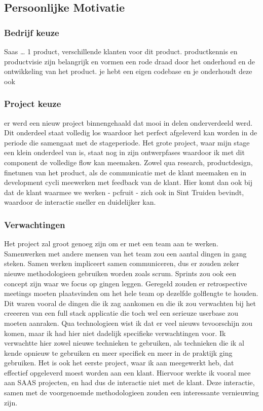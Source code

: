 \subsection {Persoonlijke Motivatie}

\subsubsection {Bedrijf keuze}

Saas … 1 product, verschillende klanten voor dit product.
productkennis en productvisie zijn belangrijk en vormen een rode draad door het onderhoud
en de ontwikkeling van het product.
je hebt een eigen codebase en je onderhoudt deze ook

\subsubsection {Project keuze}

er werd een nieuw project binnengehaald dat mooi in delen onderverdeeld werd. Dit
onderdeel staat volledig los waardoor het perfect afgeleverd kan worden in de periode die
samengaat met de stageperiode.
Het grote project, waar mijn stage een klein onderdeel van is, staat nog in zijn
ontwerpfases waardoor ik met dit component de volledige flow kan meemaken. Zowel qua
research, productdesign, finetunen van het product, als de communicatie met de klant
meemaken en in development cycli meewerken met feedback van de klant. Hier komt dan ook
bij dat de klant waarmee we werken - pcfruit - zich ook in Sint Truiden bevindt, waardoor
de interactie sneller en duidelijker kan.

\subsubsection {Verwachtingen}

Het project zal groot genoeg zijn om er met een team aan te werken. Samenwerken met
andere mensen van het team zou een aantal dingen in gang steken. Samen werken impliceert
samen communiceren, dus er zouden zeker nieuwe methodologieen gebruiken worden zoals
scrum. Sprints zou ook een concept zijn waar we focus op gingen leggen. Geregeld zouden
er retrospective meetings moeten plaatsvinden om het hele team op dezelfde golflengte te
houden. Dit waren vooral de dingen die ik zag aankomen en die ik zou verwachten bij het
creeeren van een full stack applicatie die toch wel een serieuze userbase zou moeten
aanraken.
Qua technologieen wist ik dat er veel nieuws tevoorschijn zou komen, maar ik had hier
niet dadelijk specifieke verwachtingen voor. Ik verwachtte hier zowel nieuwe technieken
te gebruiken, als technieken die ik al kende opnieuw te gebruiken en meer specifiek en
meer in de praktijk ging gebruiken.
Het is ook het eerste project, waar ik aan meegewerkt heb, dat effectief opgeleverd moest
worden aan een klant. Hiervoor werkte ik vooral mee aan SAAS projecten, en had dus de
interactie niet met de klant. Deze interactie, samen met de voorgenoemde methodologieen
zouden een interessante vernieuwing zijn.
